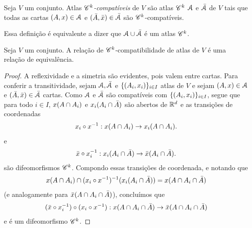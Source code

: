 \begin{definition}
Seja $V$ um conjunto. Atlas \emph{$\mathscr{C}^k$-compatíveis} de $V$ são atlas $\mathscr{C}^k$ $\mathcal{A}$ e $\bar{\mathcal{A}}$ de $V$ tais que todas as cartas $(A,x) \in \mathcal{A}$ e $(\bar A,\bar{x}) \in \bar {\mathcal{A}}$ são $\mathscr{C}^k$-compatíveis.
\end{definition}

Essa definição é equivalente a dizer que $\mathcal{A} \cup \bar {\mathcal{A}}$ é um atlas $\mathscr{C}^k$.

\begin{proposition}
Seja $V$ um conjunto. A relação de $\mathscr{C}^k$-compatibilidade de atlas de $V$ é uma relação de equivalência.
\end{proposition}
\begin{proof}
A reflexividade e a simetria são evidentes, pois valem entre cartas. Para conferir a transitividade, sejam $\mathcal{A},\bar{\mathcal{A}}$ e $\{(A_i,x_i)\}_{i \in I}$ atlas de $V$ e sejam $(A,x) \in \mathcal{A}$ e $(\bar A,\bar{x}) \in \bar{\mathcal{A}}$ cartas.
Como $\mathcal{A}$ e $\bar{\mathcal{A}}$ são compatíveis com $\{(A_i,x_i)\}_{i \in I}$, segue que para todo $i \in I$, $x(A \cap A_i)$ e $x_i(A_i \cap \bar A)$ são abertos de $\mathbb{R}^d$ e as transições de coordenadas
	\begin{equation*}
	x_i \circ x^{-1}: x(A \cap A_i) \to x_i(A \cap A_i).
	\end{equation*}
e
	\begin{equation*}
	\bar{x} \circ x_i^{-1}: x_i(A_i \cap \bar A) \to \bar{x}(A_i \cap \bar A).
	\end{equation*}
são difeomorfismos $\mathscr{C}^k$. Compondo essas transições de coordenada, e notando que
	\begin{equation*}
	x(A \cap A_i) \cap (x_i \circ x^{-1})^{-1}(x_i(A_i \cap \bar A)) = x(A \cap A_i \cap \bar A)
	\end{equation*}
(e analogamente para $\bar{x}(A \cap A_i \cap \bar A)$), concluímos que
	\begin{equation*}
	(\bar{x} \circ x_i^{-1}) \circ (x_i \circ x^{-1}): x(A \cap A_i \cap \bar A) \to \bar{x}(A \cap A_i \cap \bar A)
	\end{equation*}
e é um difeomorfismo $\mathscr{C}^k$.


\end{proof}
